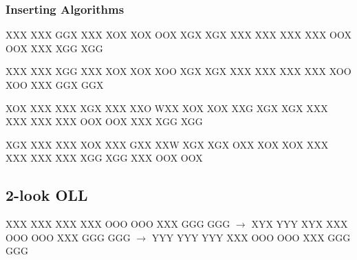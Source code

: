 \documentclass[9pt,dvipsnames]{extarticle}
\begin{document}
\begin{multicols*}{4}
\subsubsection*{Inserting Algorithms}

\noindent%
\RubikFaceUp
{X}{X}{X}
{X}{X}{X}
{G}{G}{X}%
\RubikFaceRight
{X}{X}{X}
{X}{O}{X}
{X}{O}{X}%
\RubikFaceFront
{O}{O}{X}
{X}{G}{X}
{X}{G}{X}%
\ShowCube{\cubesize}{\cubescale}{\DrawRubikCube}%
%
\RubikFaceUp
{X}{X}{X}
{X}{X}{X}
{X}{X}{X}%
\RubikFaceRight
{X}{X}{X}
{O}{O}{X}
{O}{O}{X}%
\RubikFaceFront
{X}{X}{X}
{X}{G}{G}
{X}{G}{G}%
\ShowCube{\cubesize}{\cubescale}{\DrawRubikCubeRU}

\noindent%
\RubikFaceUp
{X}{X}{X}
{X}{X}{X}
{X}{G}{G}%
\RubikFaceLeft
{X}{X}{X}
{X}{O}{X}
{X}{O}{X}%
\RubikFaceFront
{X}{O}{O}
{X}{G}{X}
{X}{G}{X}%
\ShowCube{\cubesize}{\cubescale}{\DrawRubikCubeLU}%
%
\RubikFaceUp
{X}{X}{X}
{X}{X}{X}
{X}{X}{X}%
\RubikFaceLeft
{X}{X}{X}
{X}{O}{O}
{X}{O}{O}%
\RubikFaceFront
{X}{X}{X}
{G}{G}{X}
{G}{G}{X}%
\ShowCube{\cubesize}{\cubescale}{\DrawRubikCubeLU}

\noindent%
\RubikFaceBack
{X}{O}{X}
{X}{X}{X}
{X}{X}{X}%
\RubikFaceUp
{X}{G}{X}
{X}{X}{X}
{X}{X}{O}%
\RubikFaceRight
{W}{X}{X}
{X}{O}{X}
{X}{O}{X}%
\RubikFaceFront
{X}{X}{G}
{X}{G}{X}
{X}{G}{X}%
%
%
\RubikFaceUp
{X}{X}{X}
{X}{X}{X}
{X}{X}{X}%
\RubikFaceRight
{X}{X}{X}
{O}{O}{X}
{O}{O}{X}%
\RubikFaceFront
{X}{X}{X}
{X}{G}{G}
{X}{G}{G}%
\ShowCube{\cubesize}{\cubescale}{\DrawRubikCubeRU}

\noindent%
\RubikFaceBack
{X}{G}{X}
{X}{X}{X}
{X}{X}{X}%
\RubikFaceUp
{X}{O}{X}
{X}{X}{X}
{G}{X}{X}%
\RubikFaceLeft
{X}{X}{W}
{X}{G}{X}
{X}{G}{X}%
\RubikFaceFront
{O}{X}{X}
{X}{O}{X}
{X}{O}{X}%
%
%
\RubikFaceUp
{X}{X}{X}
{X}{X}{X}
{X}{X}{X}%
\RubikFaceLeft
{X}{X}{X}
{X}{G}{G}
{X}{G}{G}%
\RubikFaceFront
{X}{X}{X}
{O}{O}{X}
{O}{O}{X}%
\ShowCube{\cubesize}{\cubescale}{\DrawRubikCubeLU}%

\subsection*{2-look OLL}

\noindent%
\RubikFaceUp%
{X}{X}{X}
{X}{X}{X}
{X}{X}{X}%
\RubikFaceRight%
{X}{X}{X}
{O}{O}{O}
{O}{O}{O}%
\RubikFaceFront%
{X}{X}{X}
{G}{G}{G}
{G}{G}{G}%
\ShowCube{\cubesize}{\cubescale}{\DrawRubikCube}%
$\rightarrow$%
\noindent%
\RubikFaceUp%
{X}{Y}{X}
{Y}{Y}{Y}
{X}{Y}{X}%
\RubikFaceRight%
{X}{X}{X}
{O}{O}{O}
{O}{O}{O}%
\RubikFaceFront%
{X}{X}{X}
{G}{G}{G}
{G}{G}{G}%
\ShowCube{\cubesize}{\cubescale}{\DrawRubikCube}%
$\rightarrow$%
\RubikFaceUp%
{Y}{Y}{Y}
{Y}{Y}{Y}
{Y}{Y}{Y}%
\RubikFaceRight%
{X}{X}{X}
{O}{O}{O}
{O}{O}{O}%
\RubikFaceFront%
{X}{X}{X}
{G}{G}{G}
{G}{G}{G}%
\ShowCube{\cubesize}{\cubescale}{\DrawRubikCube}


\end{multicols*}
\end{document}
